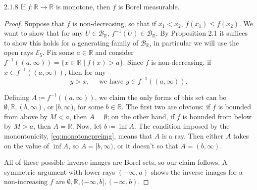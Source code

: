 \documentclass[11pt]{article}
\begin{document}
\begin{problem}{2.1.8}
If \( f: \mathbb{R} \rightarrow \mathbb{R} \) is monotone, then \( f \) is Borel measurable.
\end{problem}
\begin{proof}
  Suppose that \( f \) is non-decreasing, so that if \( x_1 < x_2 \), \( f(x_1) \leq f(x_{2}) \).
  We want to show that for any \( U \in \mathcal{B}_{\mathbb{R}} \), \( f^{-1}(U) \in \mathcal{B}_{\mathbb{R}} \).
  By Proposition 2.1 it suffices to show this holds for a generating family of \( \mathcal{B}_{\mathbb{R}} \), in particular we will use the open rays \( \mathcal{E}_5 \).
  Fix some \( a \in \mathbb{R} \) and consider \( f^{-1}((a, \infty)) = \{x \in \mathbb{R} \mid f(x) > a\} \).
  Since \( f \) is non-decreasing, if \( x \in f^{-1}((a, \infty)) \), then for any
  \begin{equation}
    \label{eq:monotonepreimg}
    y > x, \quad \text{ we have } y \in f^{-1}((a, \infty)).
  \end{equation}

  Defining \( A \coloneq f^{-1}((a,\infty)) \), we claim the only forms of this set can be \(\emptyset, \mathbb{R}, (b, \infty) \), or \([b, \infty)\), for some \( b \in \mathbb{R} \).
  The first two are obvious: if \( f \) is bounded from above by \( M < a \), then \( A = \emptyset \); on the other hand, if \( f \) is bounded from below by \( M > a \), then \( A = \mathbb{R} \).
  Now, let \( b \coloneq \inf A \).
  The condition imposed by the monontonicity, \cref{eq:monotonepreimg}, means that \( A \) is a ray.
  Then either \( A \) takes on the value of \( \inf A \), so \( A = [b, \infty) \), or it doesn't so that \( A = (b, \infty) \).

  All of these possible inverse images are Borel sets, so our claim follows.
  A symmetric argument with lower rays \( (-\infty, a) \) shows the inverse images for a non-increasing \( f \) are \( \emptyset, \mathbb{R}, (-\infty, b], (-\infty, b) \).
\end{proof}
\end{document}
